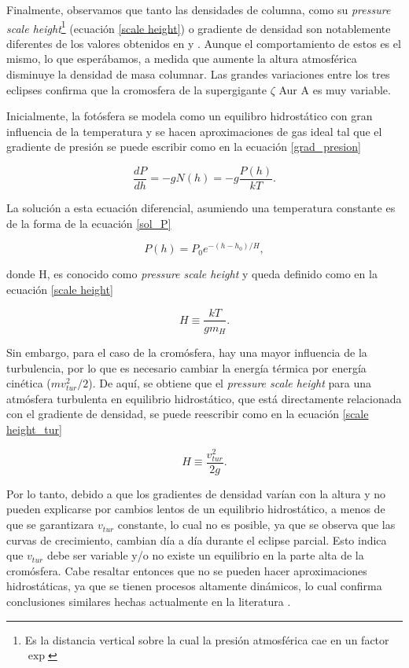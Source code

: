 \documentclass[12pt,oneside,openany,letter]{book}
\begin{document}
Finalmente, observamos que tanto las densidades de columna, como su \textit{pressure scale height}\footnote{Es la distancia vertical sobre la cual la presión atmosférica cae en un factor $\exp$} (ecuación \ref{scale height}) o gradiente de densidad son notablemente diferentes de los valores obtenidos en \citep{kps1O} y \citep{wilson1954chromospheric}. Aunque el comportamiento de estos es el mismo, lo que esperábamos, a medida que aumente la altura atmosférica disminuye la densidad de masa columnar. Las grandes variaciones entre los tres eclipses confirma que la cromosfera de la supergigante $\zeta$ Aur A es muy variable.

Inicialmente, la fotósfera se modela como un equilibro hidrostático con gran influencia de la temperatura y se hacen aproximaciones de gas ideal tal que el gradiente de presión se puede escribir como en la ecuación \ref{grad_presion}

\begin{equation}
    \frac{d P}{d h}=-g N(h) =  -g \frac{P(h)}{kT}
    \label{grad_presion}.
\end{equation}

La solución a esta ecuación diferencial, asumiendo una temperatura constante es de la forma de la ecuación \ref{sol_P}

\begin{equation}
    P(h) = P_0 e^{-(h-h_0)/H},
    \label{sol_P}
\end{equation}

donde H, es conocido como \textit{pressure scale height} y queda definido como en la ecuación \ref{scale height}

\begin{equation}
    H \equiv \frac{kT}{gm_H}.
    \label{scale height}
\end{equation}

Sin embargo, para el caso de la cromósfera, hay una mayor influencia de la turbulencia, por lo que es necesario cambiar la energía térmica por energía cinética ($mv_{tur}^2/2$). De aquí, se obtiene que el \textit{pressure scale height} para una atmósfera turbulenta en equilibrio hidrostático, que está directamente relacionada con el gradiente de densidad, se puede reescribir como en la ecuación \ref{scale height_tur}

\begin{equation}
    H \equiv \frac{v_{tur}^2}{2g}.
    \label{scale height_tur}
\end{equation}

Por lo tanto, debido a que los gradientes de densidad varían con la altura y no pueden explicarse por cambios lentos de un equilibrio hidrostático, a menos de que se garantizara $v_{tur}$ constante, lo cual no es posible, ya que se observa que las curvas de crecimiento, cambian día a día durante el eclipse parcial. Esto indica que $v_{tur}$ debe ser variable y/o no existe un equilibrio en la parte alta de la cromósfera. Cabe resaltar entonces que no se pueden hacer aproximaciones hidrostáticas, ya que se tienen procesos altamente dinámicos, lo cual confirma conclusiones similares hechas actualmente en la literatura \citep{ayres2019stellar}.
\end{document}

